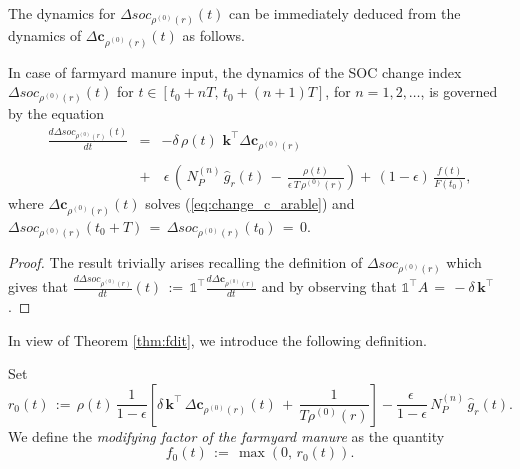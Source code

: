 \noindent The dynamics for $\Delta soc_{\rho^{(0)}(r)}(t)$ can be immediately deduced from the dynamics of $\Delta \mathbf{c}_{\rho^{(0)}(r)}(t)$ as  follows.

\begin{corollary}\label{thm:change_s_f}
In case of  farmyard manure input, the dynamics of the SOC change index 
$\Delta soc_{\rho^{(0)}(r)}(t)$
for  $t\in[t_0+nT,\,t_0+(n+1)T]$, for $n=1, 2, \dots$,
is governed by the equation
\begin{equation}\label{eq:SOCarable}
    \begin{array}{rcl}
   \displaystyle \frac{d \Delta soc_{\rho^{(0)}(r)}(t)}{dt}   &=&   -\delta\, \rho(t)\,\, \mathbf{k}^\intercal \Delta \mathbf{c}_{\rho^{(0)}(r)}\, \\\\
   &+&\, \epsilon\,\left(  \, N_P^{(n)} \, \hat g_r(t) \,-\, \displaystyle \frac{\rho(t)}{\epsilon \, T\, \rho^{(0)}(r)}  \right) + \,  (1-\epsilon)\, \displaystyle \frac{f(t)}{F(t_0)},
   \end{array}
\end{equation}
where $\Delta \mathbf{c}_{\rho^{(0)}(r)}(t)$ solves (\ref{eq:change_c_arable}) and  $\Delta soc_{\rho^{(0)}(r)}(t_0+T)\, =\, \Delta soc_{\rho^{(0)}(r)}(t_0)\,=\, 0$.
\end{corollary}
\begin{proof}
The result trivially arises recalling the definition of $\Delta soc_{\rho^{(0)}(r)}$ which gives that  
$
\displaystyle   \frac{d \Delta soc_{\rho^{(0)}(r)}}{dt} (t)\, :=\, \mathds{1}^\intercal \displaystyle \frac{d \Delta \mathbf{c}_{\rho^{(0)}(r)}}{dt}$ and by observing that $\mathds{1}^\intercal A\, =\, -\delta\, \mathbf{k}^\intercal$. 
\end{proof}
In view of Theorem \ref{thm:fdit}, we  introduce the following definition.
\begin{definition}\label{defro}
Set $$r_0(t)\, :=\, \rho(t)\, \frac{1}{1-\epsilon}\left[ \delta\, \mathbf{k}^\intercal\, \Delta \mathbf{c}_{\rho^{(0)}(r)}(t)\, +\, \frac{1}{T \rho^{(0)}(r)}\right] - \frac{\epsilon\,}{1-\epsilon}\,N_P^{(n)} \, \hat g_r(t).$$
We define the {\it modifying factor of the farmyard manure} as the quantity   $$f_0(t)\, :=\, \max \left(0,\,r_0(t)\right).$$
\end{definition}

